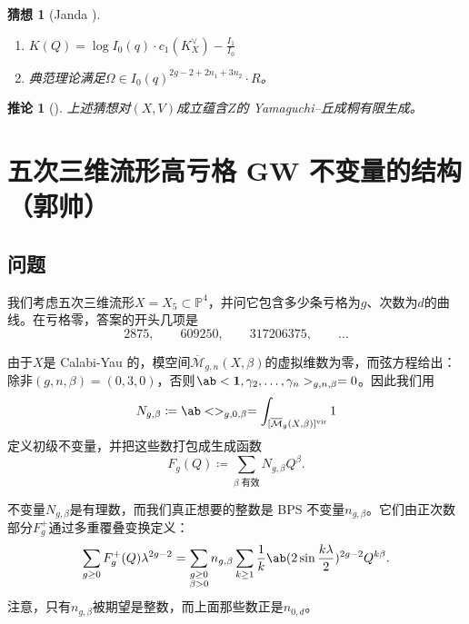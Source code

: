\documentclass{amsart}
\newtheorem{cor}[thm]{推论}
\newtheorem{conj}[thm]{猜想}
\theoremstyle{definition}
\theoremstyle{remark}
\theoremstyle{plain}
\theoremstyle{definition}
\theoremstyle{remark}
\renewcommand{\P}{\mathbb{P}}
\newcommand{\Mbar}{\overline{\mathcal{M}}}
\newcommand{\mr}[1]{\mathrm{#1}}
\newcommand{\1}{\mathbf{1}}
\newcommand{\2}{\mathbf{2}}
\newcommand{\3}{\mathbf{3}}
\newcommand{\vir}{\mr{vir}}
\begin{document}
\begin{conj}[Janda {\cite[猜想~1.6]{CJRtropical2025}}]\leavevmode
    \begin{enumerate}
        \item \(K(Q) = \log I_0(q) \cdot c_1(K_X^{\vee}) - \frac{I_1}{I_0}\) \\
        \item 典范理论满足\(\Omega \in I_0(q)^{2g-2+2n_1 + 3 n_2} \cdot R\)。
    \end{enumerate}
\end{conj}

\begin{cor}[{\cite[定理~1.7]{CJRtropical2025}}]
    上述猜想对\((X, V)\)成立蕴含\(Z\)的 Yamaguchi--丘成桐有限生成。
\end{cor}


\section{五次三维流形高亏格 GW 不变量的结构（郭帅）}%
\label{sec:Structure of higher-genus GW invariants of the quintic (Shuai Guo)}

\subsection{问题}%
\label{sub:The problem (Guo)}

我们考虑五次三维流形\(X = X_5 \subset \P^4\)，并问它包含多少条亏格为\(g\)、次数为\(d\)的曲线。在亏格零，答案的开头几项是
\[ 2875, \qquad 609250, \qquad 317206375, \qquad \ldots \]

由于\(X\)是 Calabi-Yau 的，模空间\(\Mbar_{g,n}(X,\beta)\)的虚拟维数为零，而弦方程给出：除非\((g,n,\beta) = (0,3,0)\)，否则\(\ab<\1, \gamma_2, \ldots, \gamma_n>_{g,n,\beta} = 0\)。因此我们用
\[ N_{g,\beta} \coloneqq \ab<>_{g,0,\beta} = \int_{[\Mbar_g(X,\beta)]^{\vir}} 1 \]
定义初级不变量，并把这些数打包成生成函数
\[ F_g(Q) \coloneqq \sum_{\beta \text{ 有效}} N_{g,\beta}Q^{\beta}. \]

不变量\(N_{g,\beta}\)是有理数，而我们真正想要的整数是 BPS 不变量\(n_{g,\beta}\)。它们由正次数部分\(F_g^+\)通过多重覆叠变换定义：
\[ \sum_{g \geq 0} F_g^+(Q)\lambda^{2g-2} = \sum_{\substack{g \geq 0 \\ \beta > 0}} n_{g,\beta} \sum_{k \geq 1} \frac{1}{k} \ab(2 \sin \frac{k\lambda}{2})^{2g-2}Q^{k\beta}. \]
注意，只有\(n_{g,\beta}\)被期望是整数，而上面那些数正是\(n_{0,d}\)。
\end{document}

